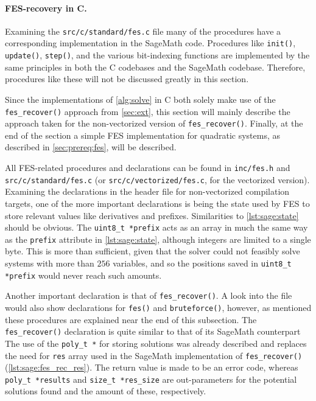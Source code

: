 \paragraph{FES-recovery in C.} Examining the \texttt{src/c/standard/fes.c} file many of the procedures have a corresponding implementation in the SageMath code. Procedures like \texttt{init()}, \texttt{update()}, \texttt{step()}, and the various bit-indexing functions are implemented by the same principles in both the C codebases and the SageMath codebase. Therefore, procedures like these will not be discussed greatly in this section.

Since the implementations of \cref{alg:solve} in C both solely make use of the \texttt{fes\_recover()} approach from \cref{sec:ext}, this section will mainly describe the approach taken for the non-vectorized version of \texttt{fes\_recover()}. Finally, at the end of the section a simple FES implementation for quadratic systems, as described in \cref{sec:prereq:fes}, will be described.

All FES-related procedures and declarations can be found in \texttt{inc/fes.h} and \texttt{src/c/standard/fes.c} (or \texttt{src/c/vectorized/fes.c}, for the vectorized version). Examining the declarations in the header file for non-vectorized compilation targets, one of the more important declarations is
being the state used by FES to store relevant values like derivatives and prefixes. Similarities to \cref{lst:sage:state} should be obvious. The \texttt{uint8\_t *prefix} acts as an array in much the same way as the \texttt{prefix} attribute in \cref{lst:sage:state}, although integers are limited to a single byte. This is more than sufficient, given that the solver could not feasibly solve systems with more than $256$ variables, and so the positions saved in \texttt{uint8\_t *prefix} would never reach such amounts.

Another important declaration is that of \texttt{fes\_recover()}. A look into the file would also show declarations for \texttt{fes()} and \texttt{bruteforce()}, however, as mentioned these procedures are explained near the end of this subsection. The \texttt{fes\_recover()} declaration is quite similar to that of its SageMath counterpart
The use of the \texttt{poly\_t *} for storing solutions was already described and replaces the need for \texttt{res} array used in the SageMath implementation of \texttt{fes\_recover()} (\cref{lst:sage:fes_rec_res}). The return value is made to be an error code, whereas \texttt{poly\_t *results} and \texttt{size\_t *res\_size} are out-parameters for the potential solutions found and the amount of these, respectively.

